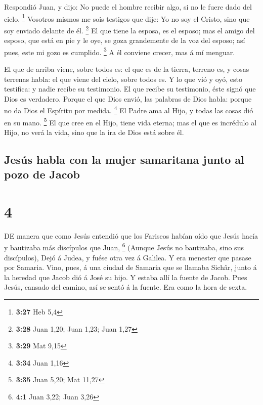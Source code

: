  Respondió Juan, y dijo: No puede el hombre recibir algo,
si no le fuere dado del cielo. \footnote{\textbf{3:27} Heb 5,4}
 Vosotros mismos me sois testigos que dije: Yo no soy el
Cristo, sino que soy enviado delante de él. \footnote{\textbf{3:28} Juan
  1,20; Juan 1,23; Juan 1,27}  El que tiene la esposa, es
el esposo; mas el amigo del esposo, que está en pie y le oye, se goza
grandemente de la voz del esposo; así pues, este mi gozo es cumplido.
\footnote{\textbf{3:29} Mat 9,15}  A él conviene crecer,
mas á mí menguar.

 El que de arriba viene, sobre todos es: el que es de la
tierra, terreno es, y cosas terrenas habla: el que viene del cielo,
sobre todos es.  Y lo que vió y oyó, esto testifica: y
nadie recibe su testimonio.  El que recibe su testimonio,
éste signó que Dios es verdadero.  Porque el que Dios
envió, las palabras de Dios habla: porque no da Dios el Espíritu por
medida. \footnote{\textbf{3:34} Juan 1,16}  El Padre ama al
Hijo, y todas las cosas dió en su mano. \footnote{\textbf{3:35} Juan
  5,20; Mat 11,27}  El que cree en el Hijo, tiene vida
eterna; mas el que es incrédulo al Hijo, no verá la vida, sino que la
ira de Dios está sobre él.

\hypertarget{jesuxfas-habla-con-la-mujer-samaritana-junto-al-pozo-de-jacob}{%
\subsection{Jesús habla con la mujer samaritana junto al pozo de
Jacob}\label{jesuxfas-habla-con-la-mujer-samaritana-junto-al-pozo-de-jacob}}

\hypertarget{section-3}{%
\section{4}\label{section-3}}

 DE manera que como Jesús entendió que los Fariseos habían
oído que Jesús hacía y bautizaba más discípulos que Juan, \footnote{\textbf{4:1}
  Juan 3,22; Juan 3,26}  (Aunque Jesús no bautizaba, sino
sus discípulos),  Dejó á Judea, y fuése otra vez á Galilea.
 Y era menester que pasase por Samaria.  Vino,
pues, á una ciudad de Samaria que se llamaba Sichâr, junto á la heredad
que Jacob dió á José su hijo.  Y estaba allí la fuente de
Jacob. Pues Jesús, cansado del camino, así se sentó á la fuente. Era
como la hora de sexta.

